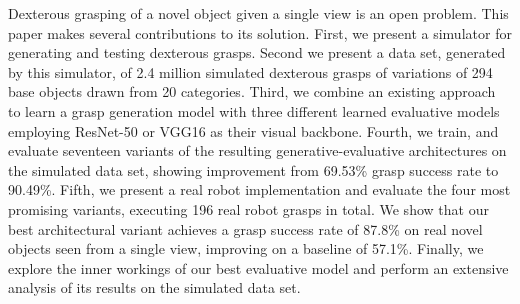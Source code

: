 Dexterous grasping of a novel object given a single view is an open problem. This paper makes several contributions to its solution. First, we present a simulator for generating and testing dexterous grasps. Second we present a data set, generated by  this simulator, of 2.4 million simulated dexterous grasps of variations of 294 base objects drawn from 20 categories. Third, we combine an existing approach to learn a grasp generation model with three different learned evaluative models employing ResNet-50 or VGG16 as their visual backbone. Fourth, we train, and evaluate seventeen variants of the resulting generative-evaluative architectures on the simulated data set, showing improvement from 69.53\% grasp success rate to 90.49\%. Fifth, we present a real robot implementation and evaluate the four most promising variants, executing 196 real robot grasps in total. We show that our best architectural variant achieves a grasp success rate of 87.8\% on real novel objects seen from a single view, improving on a baseline of 57.1\%. Finally, we explore the inner workings of our best evaluative model and perform an extensive analysis of its results on the simulated data set. 



